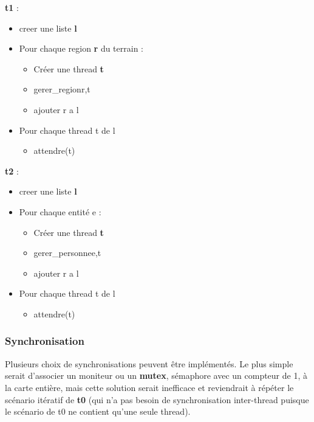 \documentclass[11pt]{article} %
\begin{document}
\textbf{t1} :
\begin{itemize}
\item creer une liste \textbf{l}
\item Pour chaque region \textbf{r} du terrain :
	\begin{itemize}
		\item Créer une  thread \textbf{t}
		\item gerer\_region{r,t}
		\item ajouter r a l
	\end{itemize}

\item Pour chaque thread t de l
\begin{itemize}
		\item attendre(t)
	\end{itemize}

\end{itemize} 
 
\textbf{t2} :
\begin{itemize}
\item creer une liste \textbf{l}
\item Pour chaque entité e :
	\begin{itemize}
		\item Créer une  thread \textbf{t}
		\item gerer\_personne{e,t}
		\item  ajouter r a l
	\end{itemize}

\item Pour chaque thread t de l
\begin{itemize}
		\item attendre(t)
	\end{itemize}

\end{itemize}

\subsubsection{Synchronisation}

Plusieurs choix de synchronisations peuvent être implémentés. Le plus simple serait d'associer un moniteur ou un \textbf{mutex}, sémaphore avec un compteur de 1, à la carte entière, mais cette solution serait inefficace et reviendrait à répéter le scénario itératif de \textbf{t0} (qui n'a pas besoin de synchronisation inter-thread puisque le scénario de t0 ne contient qu'une seule thread).
\end{document}
